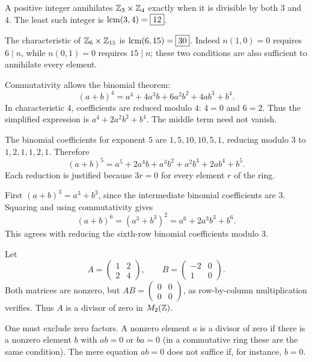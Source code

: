 A positive integer annihilates $\mathbb{Z}_3\times\mathbb{Z}_4$ exactly when it is divisible by both $3$ and $4$. The least such integer is $\operatorname{lcm}(3,4)=\boxed {12}$.

The characteristic of $\mathbb{Z}_6\times\mathbb{Z}_{15}$ is $\operatorname{lcm}(6,15)=\boxed {30}$. Indeed $n(1,0)=0$ requires $6\mid n$, while $n(0,1)=0$ requires $15\mid n$; these two conditions are also sufficient to annihilate every element.

Commutativity allows the binomial theorem:
\[(a+b)^4=a^4+4a^3b+6a^2b^2+4ab^3+b^4.
\]
In characteristic $4$, coefficients are reduced modulo $4$: $4=0$ and $6=2$. Thus the simplified expression is $\boxed{a^4+2a^2b^2+b^4}$. The middle term need not vanish.

The binomial coefficients for exponent $5$ are $1,5,10,10,5,1$, reducing modulo $3$ to $1,2,1,1,2,1$. Therefore
\[\boxed{(a+b)^5=a^5+2a^4b+a^3b^2+a^2b^3+2ab^4+b^5}.
\]
Each reduction is justified because $3r=0$ for every element $r$ of the ring.

First $(a+b)^3=a^3+b^3$, since the intermediate binomial coefficients are $3$. Squaring and using commutativity gives
\[\boxed{(a+b)^6=(a^3+b^3)^2=a^6+2a^3b^3+b^6}.
\]
This agrees with reducing the sixth-row binomial coefficients modulo $3$.

Let
\[A=\begin{pmatrix}1&2\\2&4\end{pmatrix},\qquad
B=\begin{pmatrix}-2&0\\1&0\end{pmatrix}.
\]
Both matrices are nonzero, but $AB=\begin{pmatrix}0&0\\0&0\end{pmatrix}$, as row-by-column multiplication verifies. Thus $A$ is a divisor of zero in $M_2(\mathbb{Z})$.

One must exclude zero factors. A nonzero element $a$ is a divisor of zero if there is a nonzero element $b$ with $ab=0$ or $ba=0$ (in a commutative ring these are the same condition). The mere equation $ab=0$ does not suffice if, for instance, $b=0$.

